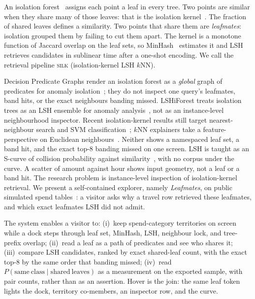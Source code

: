 \documentclass[conference]{IEEEtran}
\newcommand{\silk}{\textsc{silk}}
\newcommand{\sys}{\emph{Leafmates}}
\begin{document}
An isolation forest~\cite{Liu2008IsolationForest} assigns each point a leaf in every tree. Two points are similar when they share many of those leaves: that is the isolation kernel~\cite{Ting2018IK}. The fraction of shared leaves defines a similarity. Two points that share them are \emph{leafmates}: isolation grouped them by failing to cut them apart. The kernel is a monotone function of Jaccard overlap on the leaf sets, so MinHash~\cite{Broder1997} estimates it and LSH~\cite{Indyk1998,Leskovec2020MMDS} retrieves candidates in sublinear time after a one-shot encoding. We call the retrieval pipeline \silk{} (isolation-kernel LSH $k$NN).

Decision Predicate Graphs render an isolation forest as a \emph{global} graph of predicates for anomaly isolation~\cite{Ceschin2025DPG}; they do not inspect one query's leafmates, band hits, or the exact neighbours banding missed. LSHiForest treats isolation trees as an LSH ensemble for anomaly analysis~\cite{Zhang2017LSHiForest}, not as an instance-level neighbourhood inspector. Recent isolation-kernel results still target nearest-neighbour search and SVM classification~\cite{Ting2024NN}; $k$NN explainers take a feature-perspective on Euclidean neighbours~\cite{Barcelo2025kNN}. Neither shows a namespaced leaf set, a band hit, and the exact top-$8$ banding missed on one screen. LSH is taught as an S-curve of collision probability against similarity~\cite{Leskovec2020MMDS}, with no corpus under the curve. A scatter of amount against hour shows input geometry, not a leaf or a band hit. The research problem is instance-level inspection of isolation-kernel retrieval. We present a self-contained explorer, namely \sys{}, on public simulated spend tables~\cite{Harris2016Sparkov,Padhi2021TabFormer}: a visitor asks why a travel row retrieved these leafmates, and which exact leafmates LSH did not admit.

The system enables a visitor to: (i)~keep spend-category territories on screen while a dock steps through leaf set, MinHash, LSH, neighbour lock, and tree-prefix overlap; (ii)~read a leaf as a path of predicates and see who shares it; (iii)~compare LSH candidates, ranked by exact shared-leaf count, with the exact top-$8$ by the same order that banding missed; (iv)~read $P(\mathrm{same\ class}\mid\mathrm{shared\ leaves})$ as a measurement on the exported sample, with pair counts, rather than as an assertion. Hover is the join: the same leaf token lights the dock, territory co-members, an inspector row, and the curve.
\end{document}
